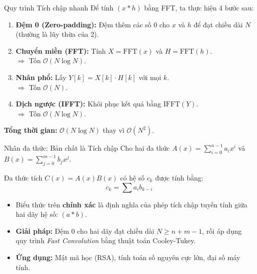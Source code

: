 \begin{frame}{Quy trình Tích chập nhanh }
    Để tính $(x * h)$ bằng FFT, ta thực hiện 4 bước sau:
    \vspace{0.3cm}
    \begin{enumerate}
        \item \textbf{Đệm 0 (Zero-padding):} Đệm thêm các số $0$ cho $x$ và $h$ để đạt chiều dài $N$ (thường là lũy thừa của 2).
        \item \textbf{Chuyển miền (FFT):} Tính $X = \text{FFT}(x)$ và $H = \text{FFT}(h)$. \\ $\Rightarrow$ Tốn $\mathcal{O}(N \log N)$.
        \item \textbf{Nhân phổ:} Lấy $Y[k] = X[k] \cdot H[k]$ với mọi $k$. \\ $\Rightarrow$ Tốn $\mathcal{O}(N)$.
        \item \textbf{Dịch ngược (IFFT):} Khôi phục kết quả bằng $\text{IFFT}(Y)$. \\ $\Rightarrow$ Tốn $\mathcal{O}(N \log N)$.
    \end{enumerate}
    \vspace{0.3cm}
    \textbf{Tổng thời gian:} $\mathcal{O}(N \log N)$ thay vì $\mathcal{O}(N^2)$.
\end{frame}

\begin{frame}{Nhân đa thức: Bản chất là Tích chập}
    Cho hai đa thức $A(x) = \sum_{i=0}^{n-1} a_i x^i$ và $B(x) = \sum_{j=0}^{m-1} b_j x^j$.
    \vspace{0.3cm}
    
    Đa thức tích $C(x) = A(x)B(x)$ có hệ số $c_k$ được tính bằng:
    $$c_k = \sum a_i b_{k-i}$$
    
    \begin{itemize}
        \item Biểu thức trên \textbf{chính xác} là định nghĩa của phép tích chập tuyến tính giữa hai dãy hệ số: $(a * b)$.
        \item \textbf{Giải pháp:} Đệm $0$ cho hai dãy đạt chiều dài $N \ge n+m-1$, rồi áp dụng quy trình \textit{Fast Convolution} bằng thuật toán Cooley-Tukey.
        \item \textbf{Ứng dụng:} Mật mã học (RSA), tính toán số nguyên cực lớn, đại số máy tính.
    \end{itemize}
\end{frame}

